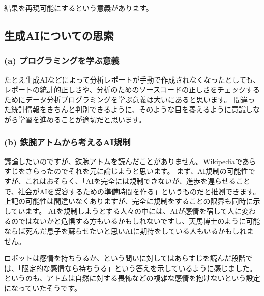 \documentclass[
]{article}
\begin{document}
結果を再現可能にするという意義があります。

\hypertarget{ux751fux6210aiux306bux3064ux3044ux3066ux306eux601dux7d22}{%
\subsection{生成AIについての思索}\label{ux751fux6210aiux306bux3064ux3044ux3066ux306eux601dux7d22}}

\hypertarget{a-ux30d7ux30edux30b0ux30e9ux30dfux30f3ux30b0ux3092ux5b66ux3076ux610fux7fa9}{%
\subsubsection{(a)
プログラミングを学ぶ意義}\label{a-ux30d7ux30edux30b0ux30e9ux30dfux30f3ux30b0ux3092ux5b66ux3076ux610fux7fa9}}

たとえ生成AIなどによって分析レポートが手動で作成されなくなったとしても、レポートの統計的正しさや、分析のためのソースコードの正しさをチェックするためにデータ分析プログラミングを学ぶ意義は大いにあると思います。
間違った統計情報をきちんと判別できるように、そのような目を養えるように意識しながら学習を進めることが適切だと思います。

\hypertarget{b-ux9244ux8155ux30a2ux30c8ux30e0ux304bux3089ux8003ux3048ux308baiux898fux5236}{%
\subsubsection{(b)
鉄腕アトムから考えるAI規制}\label{b-ux9244ux8155ux30a2ux30c8ux30e0ux304bux3089ux8003ux3048ux308baiux898fux5236}}

議論したいのですが、鉄腕アトムを読んだことがありません。Wikipediaであらすじをさらったのでそれを元に論じようと思います。
まず、AI規制の可能性ですが、これはおそらく、「AIを完全には規制できないが、進歩を遅らせることで、社会がAIを受容するための準備時間を作る」というものだと推測できます。上記の可能性は間違いなくありますが、完全に規制をすることの限界も同時に示しています。
AIを規制しようとする人々の中には、AIが感情を宿して人に変わるのではないかと危惧する方もいるかもしれないですし、天馬博士のように可能ならば死んだ息子を蘇らせたいと思いAIに期待をしている人もいるかもしれません。

ロボットは感情を持ちうるか、という問いに対してはあらすじを読んだ段階では、「限定的な感情なら持ちうる」という答えを示しているように感じました。というのも、アトムは自然に対する畏怖などの複雑な感情を抱けないという設定になっていたそうです。
\end{document}
